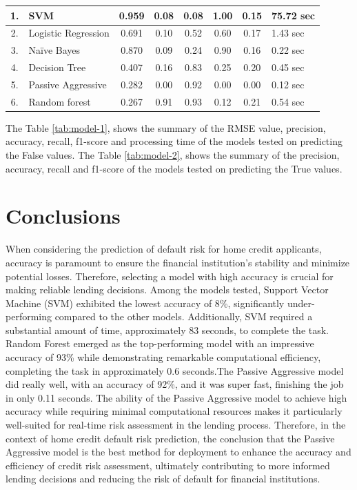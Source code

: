 \documentclass{josis}
\begin{document}
{\begin{table}
\begin{tabular}{|c|l|c|c|c|c|c|l|}
1.& SVM  &0.959 &0.08 &0.08 &1.00 &0.15 &75.72 sec\\ \hline
2. & Logistic Regression & 0.691 & 0.10 & 0.52 & 0.60 & 0.17 & 1.43 sec \\ \hline
3. & Naïve Bayes& 0.870 & 0.09 & 0.24 & 0.90 & 0.16 & 0.22 sec \\ \hline
4. & Decision Tree & 0.407 & 0.16 & 0.83 & 0.25 & 0.20 & 0.45 sec \\ \hline
5. & Passive Aggressive & 0.282 & 0.00 & 0.92 & 0.00 & 0.00 & 0.12 sec \\ \hline
6.& Random forest    &0.267 &0.91 &0.93 &0.12 &0.21 &0.54 sec\\ \hline 
\end{tabular}
\end{table}
The Table \ref{tab:model-1}, shows the summary of the RMSE value, precision, accuracy, recall, f1-score and processing time of the models tested on predicting the False values. The Table \ref{tab:model-2}, shows the summary of the precision, accuracy, recall and f1-score of the models tested on predicting the True values.

\section{Conclusions}
When considering the prediction of default risk for home credit applicants, accuracy is paramount to ensure the financial institution's stability and minimize potential losses. Therefore, selecting a model with high accuracy is crucial for making reliable lending decisions. Among the models tested, Support Vector Machine (SVM) exhibited the lowest accuracy of 8\%, significantly under-performing compared to the other models. Additionally, SVM required a substantial amount of time, approximately 83 seconds, to complete the task. Random Forest emerged as the top-performing model with an impressive accuracy of 93\% while demonstrating remarkable computational efficiency, completing the task in approximately 0.6 seconds.The Passive Aggressive model did really well, with an accuracy of 92\%, and it was super fast, finishing the job in only 0.11 seconds. The ability of the Passive Aggressive model to achieve high accuracy while requiring minimal computational resources makes it particularly well-suited for real-time risk assessment in the lending process. Therefore, in the context of home credit default risk prediction, the conclusion that the Passive Aggressive model is the best method for deployment to enhance the accuracy and efficiency of credit risk assessment, ultimately contributing to more informed lending decisions and reducing the risk of default for financial institutions.

}
\end{document}
